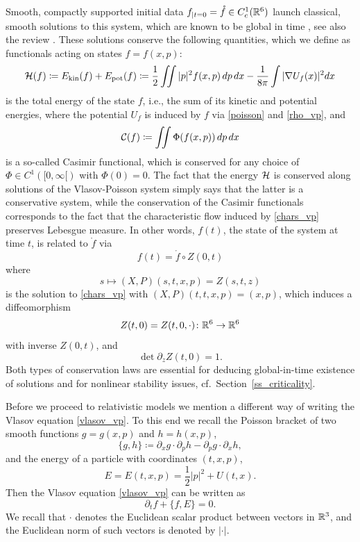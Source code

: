 \documentclass[11pt]{article}
\begin{document}
Smooth, compactly supported initial data
$f_{|t=0} =\mathring{f} \in C^1_c(\mathbb R^6)$
launch classical, smooth solutions to this system, which are
known to be global in time \cite{LP,Pf,Sch1}, see also the review
\cite{Rein07}. These solutions conserve
the following
quantities, which we define as functionals acting on states $f=f(x,p)$:
\begin{equation} \label{energy_vp}
  {\cal H}(f) \coloneqq E_\mathrm{kin} (f) + E_\mathrm{pot} (f)
  \coloneqq \frac{1}{2} \iint |p|^2 f(x,p)\,dp\,dx
  - \frac{1}{8 \pi} \int |\nabla U_f(x)|^2 dx
\end{equation}
is the total energy of the state $f$, i.e., the sum of its kinetic and
potential energies, where the potential $U_f$ is induced by $f$ via
\eqref{poisson} and \eqref{rho_vp}, and
\begin{equation} \label{casi_vp}
  {\cal C}(f) \coloneqq \iint \Phi(f(x,p))\,dp\,dx
\end{equation}
is a so-called Casimir functional, which is conserved for any choice of
$\Phi \in C^1([0,\infty[)$ with $\Phi(0)=0$.
The fact that the energy ${\cal H}$ is conserved along solutions
of the Vlasov-Poisson system simply says that the latter is a conservative
system, while the conservation of the Casimir functionals corresponds
to the fact that the characteristic flow induced by \eqref{chars_vp}
preserves Lebesgue measure. In other words, $f(t)$,
the state of the system at time $t$, is related to $\mathring{f}$ via
\begin{equation} \label{ftfn}
  f(t) = \mathring{f} \circ Z(0,t)
\end{equation}
where
\[
s \mapsto (X,P)(s,t,x,p) = Z(s,t,z)
\]
is the solution to \eqref{chars_vp} with $(X,P)(t,t,x,p)= (x,p)$,
which induces a diffeomorphism
\[
Z(t,0) = Z(t,0,\cdot)\colon \mathbb R^6 \to \mathbb R^6
\]
with inverse $Z(0,t)$, and
\[
\det \partial_z Z (t,0) = 1.
\]
Both types of conservation laws are essential
for deducing global-in-time existence of solutions and for nonlinear
stability issues, cf.\ Section~\ref{ss_criticality}.

Before we proceed to relativistic models we mention a different way of writing
the Vlasov equation \eqref{vlasov_vp}. To this end we recall the Poisson
bracket of two smooth functions $g=g(x,p)$ and $h=h(x,p)$,
\begin{equation}\label{pbracket}
  \{g,h\} \coloneqq \partial_x g \cdot \partial_p h
  - \partial_p g \cdot \partial_x h,
\end{equation}
and the energy of a particle with coordinates $(t,x,p)$,
\begin{equation}\label{parten_vp}
  E = E(t,x,p) = \frac{1}{2} |p|^2 + U(t,x).
\end{equation}
Then the Vlasov equation \eqref{vlasov_vp} can be written as
\begin{equation}\label{vlasov_bracket}
  \partial_t f + \{f,E\} = 0 .
\end{equation}
We recall that $\cdot$ 
denotes the Euclidean scalar
product between vectors in $\mathbb R^3$, and the Euclidean norm of such vectors
is denoted by $|\cdot|$.
%
%
\end{document}
